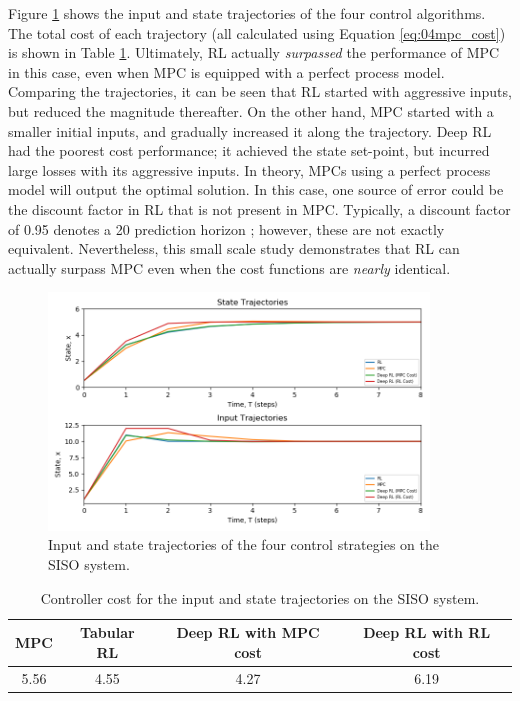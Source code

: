Figure \ref{fig:04SISOcomp} shows the input and state trajectories of the four control algorithms. The total cost of each trajectory (all calculated using Equation \ref{eq:04mpc_cost}) is shown in Table \ref{tab:04SISOCost}. Ultimately, RL actually \textit{surpassed} the performance of MPC in this case, even when MPC is equipped with a perfect process model. Comparing the trajectories, it can be seen that RL started with aggressive inputs, but reduced the magnitude thereafter.  On the other hand, MPC started with a smaller initial inputs, and gradually increased it along the trajectory. Deep RL had the poorest cost performance; it achieved the state set-point, but incurred large losses with its aggressive inputs. In theory, MPCs using a perfect process model will output the optimal solution.  In this case, one source of error could be the discount factor in RL that is not present in MPC. Typically, a discount factor of 0.95 denotes a 20 prediction horizon \cite{deeplearning_course}; however, these are not exactly equivalent. Nevertheless, this small scale study demonstrates that RL can actually surpass MPC even when the cost functions are \textit{nearly} identical.  

\begin{figure}[H]
    \centering
    \includegraphics[width=0.9\textwidth]{images/ch4/States_and_Inputs_SISO2.png}
    \caption{Input and state trajectories of the four control strategies on the SISO system.}
    \label{fig:04SISOcomp}
\end{figure}

\begin{table}[H]
\caption{Controller cost for the input and state trajectories on the SISO system.}
\label{tab:04SISOCost}
\centering
\begin{tabular}{c|c|c|c}
\textbf{MPC} & \textbf{Tabular RL} & \textbf{Deep RL with MPC cost}& \textbf{Deep RL with RL cost} \\
\hline
5.56	     & 4.55	               & 4.27                         & 6.19	 \\
\end{tabular}
\end{table}







